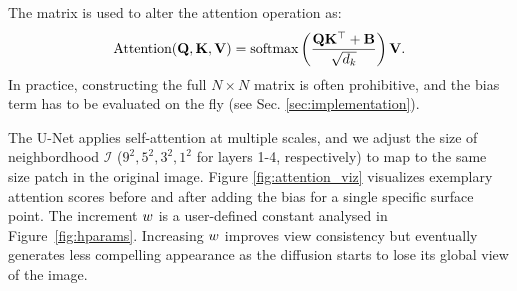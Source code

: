 The matrix is used to alter the attention operation as:
\[
\text{Attention}(\mathbf{Q}, \mathbf{K}, \mathbf{V}) = \text{softmax}\left(\frac{\mathbf{Q} \mathbf{K}^\top + \mathbf{B}}{\sqrt{d_k}}\right)\mathbf{V}.
\]
In practice, constructing the full $N \times N$ matrix is often prohibitive, and the bias term has to be evaluated on the fly (see Sec. \ref{sec:implementation}).

The U-Net applies self-attention at multiple scales, and we adjust the size of neighbordhood $\mathcal{I}$ ($9^2, 5^2, 3^2, 1^2$ for layers 1-4, respectively) to map to the same size patch in the original image. Figure \ref{fig:attention_viz} visualizes exemplary attention scores before and after adding the bias for a single specific surface point. The increment $w$ is a user-defined constant analysed in Figure~\ref{fig:hparams}. Increasing $w$ improves view consistency but eventually generates less compelling appearance as the diffusion starts to lose its global view of the image.












    










    

    


    






    















    




